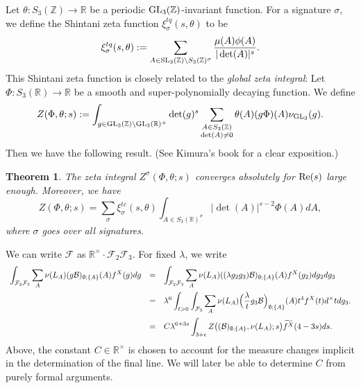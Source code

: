 \documentclass{article}
\def\Z{{\mathbb Z}}
\def\SL{{\rm SL}}
\def\GL{{\rm GL}}
\def\Re{{\rm Re}}
\def\R{{\mathbb R}}
\def\cB{{\mathcal B}}
\def\FF{{\mathcal F}}
\def\Z{{\mathbb Z}}
\def\wt{\widetilde}
\newtheorem{theorem}{Theorem}[section]
\begin{document}
Let $\theta: S_3(\Z)\to\R$ be a periodic $\GL_3(\Z)$-invariant function. 
For a signature $\sigma$, we define the Shintani zeta function $\xi_\sigma^{tq}(s,\theta)$ to be
\begin{equation}\label{eq:TQ_Shintani_zeta}
\xi_\sigma^{tq}(s,\theta):=\sum_{A\in \SL_3(\Z)\backslash S_3(\Z)^\sigma} \frac{\mu(A)\phi(A)}{|\det(A)|^s}.
\end{equation}
This Shintani zeta function is closely related to the {\it global zeta integral}: Let $\Phi:S_3(\R)\to\R$ be a smooth and super-polynomially decaying function. We define
\begin{equation}\label{eq:tq_SZF}
Z(\Phi,\theta;s):= \int_{g\in\GL_3(\Z)\backslash\GL_3(\R)^+}\det(g)^s\sum_{\substack{A\in S_3(\Z)\\\det(A)\neq 0}}\theta(A)(g\Phi)(A)\nu_{\GL_3}(g).
\end{equation}
Then we have the following result. (See Kimura's book \cite[Section 5]{Kimura_book} for a clear exposition.)
\begin{theorem}\label{thm:zeta_integral_Shintani}
The zeta integral $Z^\sigma(\Phi,\theta;s)$ converges absolutely for $\Re(s)$ large enough. Moreover, we have
\begin{equation*}
Z(\Phi,\theta;s)=\sum_{\sigma}\xi_\sigma^{tc}(s,\theta)\int_{A\in S_3(\R)^\sigma}|\det(A)|^{s-2}\Phi(A)dA,
\end{equation*}
where $\sigma$ goes over all signatures.
\end{theorem}

We can write $\FF$ as $\R^\times\cdot\FF_2\FF_3$. For fixed $\lambda$, we write 
\begin{equation*}
\begin{array}{rcl}
\displaystyle \int_{\FF_2\FF_3}\sum_{A}\nu(L_{A})(g\cB)_{\emptyset;\{A\}}(A)f^X(g)dg
&=&\displaystyle
\int_{\FF_2\FF_3}
\sum_{A}\nu(L_{A})((\lambda g_2g_3)\cB)_{\emptyset;\{A\}}(A)f^X(g_2) dg_2dg_3
\\[.2in]&=&\displaystyle
\lambda^6\int_{t>0}\int_{\FF_3}
\sum_{A}\nu(L_{A})\Bigl(\frac{\lambda}{t} g_3\cB\Bigr)_{\emptyset;\{A\}}(A)t^4f^X(t)d^\times tdg_3 .
\\[.2in]&=&\displaystyle
C\lambda^{6+3s}\int_{3+\epsilon}Z\bigl((\cB)_{\emptyset;\{A\}},\nu(L_A);s\bigr)\wt{f^X}(4-3s)ds.
\end{array}
\end{equation*}
Above, the constant $C\in\R^\times$ is chosen to account for the measure changes implicit in the determination of the final line. We will later be able to determine $C$ from purely formal arguments.
\end{document}
